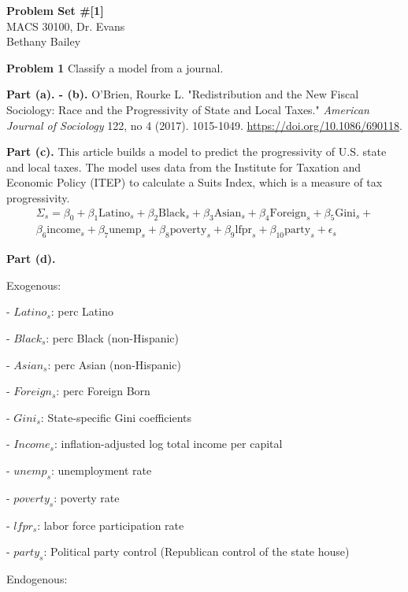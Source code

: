 \documentclass[letterpaper,12pt]{article}
\theoremstyle{definition}
\begin{document}
\begin{flushleft}
  \textbf{\large{Problem Set \#[1]}} \\
  MACS 30100, Dr. Evans \\
  Bethany Bailey
\end{flushleft}

\vspace{5mm}

\noindent\textbf{Problem 1} Classify a model from a journal.

\textbf{Part (a). - (b).} O'Brien, Rourke L. "Redistribution and the New Fiscal Sociology: Race and the Progressivity of State and Local Taxes." \textit{American Journal of Sociology} 122, no 4 (2017). 1015-1049. \href{url}{https://doi.org/10.1086/690118}.

\textbf{Part (c).} This article builds a model to predict the progressivity of U.S. state and local taxes. The model uses data from the Institute for Taxation and Economic Policy (ITEP) to calculate a Suits Index, which is a measure of tax progressivity.
\begin{multline}
  \Sigma_{s} = \beta_{0} + \beta_{1} \text{Latino}_{s} + \beta_{2} \text{Black}_{s} + \beta_{3} \text{Asian}_{s}+ \beta_{4} \text{Foreign}_{s} + \beta_{5} \text{Gini}_{s} + \\
  \beta_{6} \text{income}_{s} + \beta_{7} \text{unemp}_{s} + \beta_{8} \text{poverty}_{s} + \beta_{9} \text{lfpr}_{s} + \beta_{10} \text{party}_{s} + \epsilon_{s}
\end{multline}


\textbf{Part (d).}

Exogenous: 

- $Latino_{s}$: perc Latino

- $Black_{s}$: perc Black (non-Hispanic)
	
- $Asian_{s}$: perc Asian (non-Hispanic)
	
- $Foreign_{s}$: perc Foreign Born
	
- $Gini_{s}$: State-specific Gini coefficients
	
- $Income_{s}$: inflation-adjusted log total income per capital
	
- $unemp_{s}$: unemployment rate
	
- $poverty_{s}$: poverty rate
	
- $lfpr_{s}$: labor force participation rate
	
- $party_{s}$: Political party control (Republican control of the state house)

Endogenous:
\end{document}
